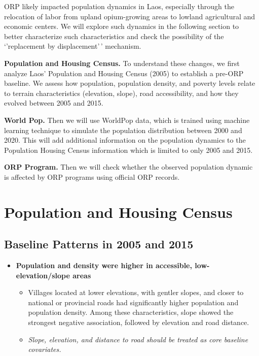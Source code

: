 \documentclass[
  letterpaper,
  DIV=11,
  numbers=noendperiod]{scrartcl}
\begin{document}
ORP likely impacted population dynamics in Laos, especially through the
relocation of labor from upland opium-growing areas to lowland
agricultural and economic centers. We will explore such dynamics in the
following section to better characterize such characteristics and check
the possibility of the `'replacement by displacement'\,' mechanism.

\textbf{Population and Housing Census.} To understand these changes, we
first analyze Laos' Population and Housing Census (2005) to establish a
pre-ORP baseline. We assess how population, population density, and
poverty levels relate to terrain characteristics (elevation, slope),
road accessibility, and how they evolved between 2005 and 2015.

\textbf{World Pop.} Then we will use WorldPop data, which is trained
using machine learning technique to simulate the population distribution
between 2000 and 2020. This will add additional information on the
population dynamics to the Population Housing Census information which
is limited to only 2005 and 2015.

\textbf{ORP Program.} Then we will check whether the observed population
dynamic is affected by ORP programs using official ORP records.

\section{Population and Housing
Census}\label{population-and-housing-census}

\subsection{Baseline Patterns in 2005 and
2015}\label{baseline-patterns-in-2005-and-2015}

\begin{itemize}
\item
  \textbf{Population and density were higher in accessible,
  low-elevation/slope areas}

  \begin{itemize}
  \item
    Villages located at lower elevations, with gentler slopes, and
    closer to national or provincial roads had significantly higher
    population and population density. Among these characteristics,
    slope showed the strongest negative association, followed by
    elevation and road distance.
  \item
    \emph{Slope, elevation, and distance to road should be treated as
    core baseline covariates.}
  \end{itemize}
\end{itemize}
\end{document}
